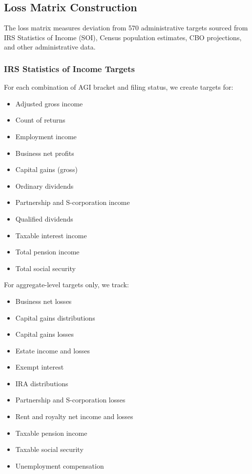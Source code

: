 \subsection{Loss Matrix Construction}

The loss matrix measures deviation from 570 administrative targets sourced from IRS Statistics of Income (SOI), Census population estimates, CBO projections, and other administrative data.

\subsubsection{IRS Statistics of Income Targets}

For each combination of AGI bracket and filing status, we create targets for:

\begin{itemize}
    \item Adjusted gross income
    \item Count of returns
    \item Employment income
    \item Business net profits
    \item Capital gains (gross)
    \item Ordinary dividends
    \item Partnership and S-corporation income
    \item Qualified dividends 
    \item Taxable interest income
    \item Total pension income
    \item Total social security
\end{itemize}

For aggregate-level targets only, we track:
\begin{itemize}
    \item Business net losses
    \item Capital gains distributions
    \item Capital gains losses
    \item Estate income and losses
    \item Exempt interest
    \item IRA distributions
    \item Partnership and S-corporation losses
    \item Rent and royalty net income and losses
    \item Taxable pension income
    \item Taxable social security
    \item Unemployment compensation
\end{itemize}

